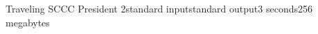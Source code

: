 \begin{problem}{Traveling SCCC President 2}{standard input}{standard output}{3 seconds}{256 megabytes}



\Examples

\begin{example}
%
%
\end{example}

\end{problem}

